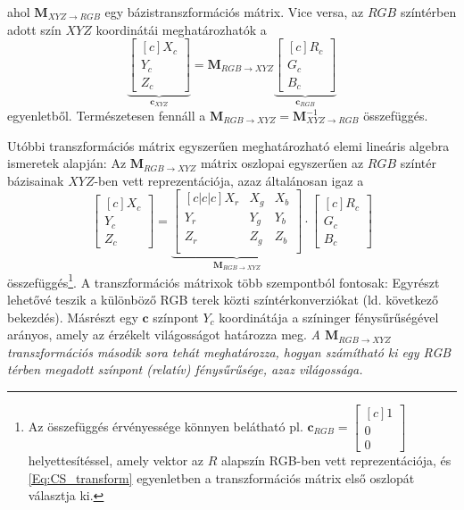 ahol $ \mathbf{M}_{X\!Y\!Z \rightarrow R\!G\!B}$ egy bázistranszformációs mátrix. 
Vice versa, az $RGB$ színtérben adott szín $XYZ$ koordinátái meghatározhatók a 
\begin{equation}
      \underbrace{\begin{bmatrix}[c]
       X_c \\[0.3em]
       Y_c \\[0.3em]
       Z_c \end{bmatrix}}_{\mathbf{c}_{X\!Y\!Z}} = 
     \mathbf{M}_{R\!G\!B \rightarrow X\!Y\!Z}
\underbrace{\begin{bmatrix}[c]
       R_c \\[0.3em]
       G_c \\[0.3em]
       B_c \end{bmatrix}}_{\mathbf{c}_{RGB}}
\end{equation}
egyenletből.
Természetesen fennáll a $\mathbf{M}_{R\!G\!B \rightarrow X\!Y\!Z} = \mathbf{M}_{X\!Y\!Z \rightarrow R\!G\!B}^{-1}$ összefüggés.

Utóbbi transzformációs mátrix egyszerűen meghatározható elemi lineáris algebra ismeretek alapján:
Az $\mathbf{M}_{R\!G\!B \rightarrow X\!Y\!Z}$  mátrix oszlopai egyszerűen az $RGB$ színtér bázisainak $XYZ$-ben vett reprezentációja, azaz általánosan igaz a
\begin{equation}
\begin{bmatrix}[c]
       X_c \\[0.3em]
       Y_c \\[0.3em]
       Z_c \end{bmatrix}
       = 
       \underbrace{
  \begin{bmatrix}[c|c|c]
   X_r & X_g & X_b  \\
   Y_r & Y_g & Y_b \\
   Z_r & Z_g & Z_b  \\
\end{bmatrix}}_{\mathbf{M}_{R\!G\!B \rightarrow X\!Y\!Z}}
\cdot
\begin{bmatrix}[c]
       R_c \\[0.3em]
       G_c \\[0.3em]
       B_c \end{bmatrix}
\label{Eq:CS_transform}
\end{equation}
összefüggés\footnote{Az összefüggés érvényessége könnyen belátható pl. $\mathbf{c}_{RGB} = \begin{bmatrix}[c]
       1 \\[0.3em]
       0 \\[0.3em]
       0 \end{bmatrix}$ helyettesítéssel, amely vektor az $R$ alapszín RGB-ben vett reprezentációja, és \eqref{Eq:CS_transform} egyenletben a transzformációs mátrix első oszlopát választja ki.}.
A transzformációs mátrixok több szempontból fontosak: 
Egyrészt lehetővé teszik a különböző RGB terek közti színtérkonverziókat (ld. következő bekezdés).
Másrészt egy $\mathbf{c}$ színpont $Y_c$ koordinátája a színinger fénysűrűségével arányos, amely az érzékelt világosságot határozza meg.
\emph{A $\mathbf{M}_{R\!G\!B \rightarrow X\!Y\!Z}$ transzformációs második sora tehát meghatározza, hogyan számítható ki egy RGB térben megadott színpont (relatív) fénysűrűsége, azaz világossága.}

